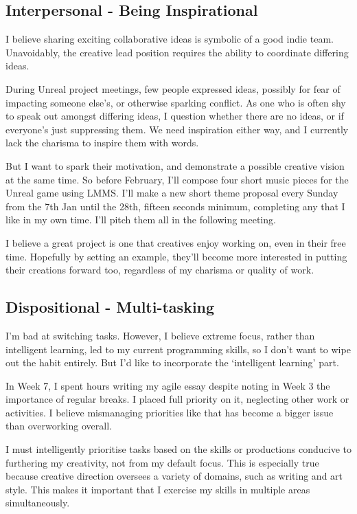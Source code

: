 \documentclass{scrartcl}
\begin{document}
\subsection{Interpersonal - Being Inspirational} %

I believe sharing exciting collaborative ideas is symbolic of a good indie team. Unavoidably, the creative lead position requires the ability to coordinate differing ideas.

During Unreal project meetings, few people expressed ideas, possibly for fear of impacting someone else's, or otherwise sparking conflict. As one who is often shy to speak out amongst differing ideas, I question whether there are no ideas, or if everyone's just suppressing them. We need inspiration either way, and I currently lack the charisma to inspire them with words.

But I want to spark their motivation, and demonstrate a possible creative vision at the same time. So before February, I'll compose four short music pieces for the Unreal game using LMMS. I'll make a new short theme proposal every Sunday from the 7th Jan until the 28th, fifteen seconds minimum, completing any that I like in my own time. I'll pitch them all in the following meeting.

I believe a great project is one that creatives enjoy working on, even in their free time. Hopefully by setting an example, they'll become more interested in putting their creations forward too, regardless of my charisma or quality of work.

\subsection{Dispositional - Multi-tasking} %

I'm bad at switching tasks. However, I believe extreme focus, rather than intelligent learning, led to my current programming skills, so I don't want to wipe out the habit entirely. But I'd like to incorporate the `intelligent learning' part.

In Week 7, I spent hours writing my agile essay despite noting in Week 3 the importance of regular breaks. I placed full priority on it, neglecting other work or activities. I believe mismanaging priorities like that has become a bigger issue than overworking overall.

I must intelligently prioritise tasks based on the skills or productions conducive to furthering my creativity, not from my default focus. This is especially true because creative direction oversees a variety of domains, such as writing and art style. This makes it important that I exercise my skills in multiple areas simultaneously.
\end{document}
